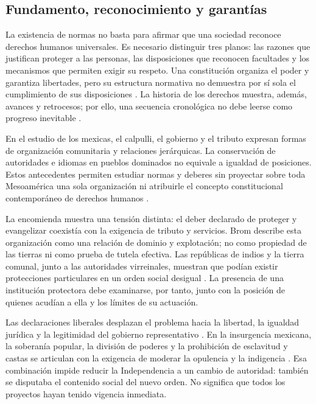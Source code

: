 \documentclass[12pt,spanish,letterpaper,oneside]{article}
\begin{document}
\subsection{Fundamento, reconocimiento y garant\'ias}
La existencia de normas no basta para afirmar que una sociedad reconoce
derechos humanos universales. Es necesario distinguir tres planos: las
razones que justifican proteger a las personas, las disposiciones que
reconocen facultades y los mecanismos que permiten exigir su respeto.
Una constituci\'on organiza el poder y garantiza libertades, pero su estructura
normativa no demuestra por s\'i sola el cumplimiento de sus disposiciones
\citep[pp.~1--2]{arteaga}. La historia de los derechos muestra, adem\'as,
avances y retrocesos; por ello, una secuencia cronol\'ogica no debe leerse
como progreso inevitable \citep[p.~11]{alvarez2009}.

En el estudio de los mexicas, el calpulli, el gobierno y el tributo expresan
formas de organizaci\'on comunitaria y relaciones jer\'arquicas. La conservaci\'on
de autoridades e idiomas en pueblos dominados no equivale a igualdad de
posiciones. Estos antecedentes permiten estudiar normas y deberes sin
proyectar sobre toda Mesoam\'erica una sola organizaci\'on ni atribuirle el
concepto constitucional contempor\'aneo de derechos humanos
\citep[cap.~1]{brom2017}.

La encomienda muestra una tensi\'on distinta: el deber declarado de proteger
y evangelizar coexist\'ia con la exigencia de tributo y servicios. Brom
describe esta organizaci\'on como una relaci\'on de dominio y explotaci\'on;
no como propiedad de las tierras ni como prueba de tutela efectiva.
Las rep\'ublicas de indios y la tierra comunal, junto a las autoridades
virreinales, muestran que pod\'ian existir protecciones particulares en un
orden social desigual \citep[caps.~5--6]{brom2017}. La presencia de una
instituci\'on protectora debe examinarse, por tanto, junto con la posici\'on
de quienes acud\'ian a ella y los l\'imites de su actuaci\'on.

Las declaraciones liberales desplazan el problema hacia la libertad, la
igualdad jur\'idica y la legitimidad del gobierno representativo
\citep[pp.~11--13]{alvarez2009}. En la insurgencia mexicana, la soberan\'ia
popular, la divisi\'on de poderes y la prohibici\'on de esclavitud y castas
se articulan con la exigencia de moderar la opulencia y la indigencia
\citep[nums.~5, 12 y 15]{morelos1813}. Esa combinaci\'on impide reducir
la Independencia a un cambio de autoridad: tambi\'en se disputaba el
contenido social del nuevo orden. No significa que todos los proyectos
hayan tenido vigencia inmediata.
\end{document}
